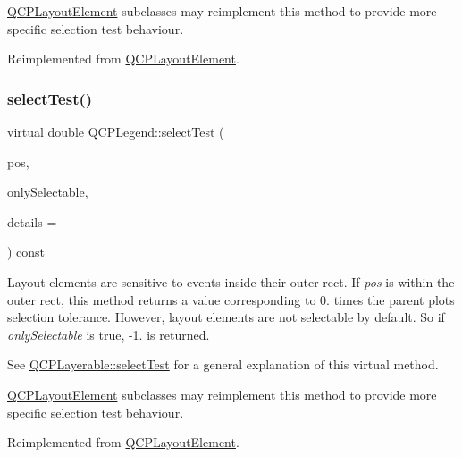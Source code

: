 \hyperlink{class_q_c_p_layout_element}{Q\+C\+P\+Layout\+Element} subclasses may reimplement this method to provide more specific selection test behaviour. 

Reimplemented from \hyperlink{class_q_c_p_layout_element_ae97f483cccedadbf18ea4525ef240ee4}{Q\+C\+P\+Layout\+Element}.

\mbox{\label{class_q_c_p_legend_a9dc868bd95069fad9f40718b7715e100}} 
\subsubsection{\texorpdfstring{select\+Test()}{selectTest()}\hspace{0.1cm}{\footnotesize\ttfamily [2/2]}}
{\footnotesize\ttfamily virtual double Q\+C\+P\+Legend\+::select\+Test (\begin{DoxyParamCaption}\item[{const Q\+PointF \&}]{pos,  }\item[{bool}]{only\+Selectable,  }\item[{Q\+Variant $\ast$}]{details = {} }\end{DoxyParamCaption}) const\hspace{0.3cm}{\ttfamily [virtual]}}

Layout elements are sensitive to events inside their outer rect. If {\itshape pos} is within the outer rect, this method returns a value corresponding to 0. times the parent plot\textquotesingle{}s selection tolerance. However, layout elements are not selectable by default. So if {\itshape only\+Selectable} is true, -\/1. is returned.

See \hyperlink{class_q_c_p_layerable_a04db8351fefd44cfdb77958e75c6288e}{Q\+C\+P\+Layerable\+::select\+Test} for a general explanation of this virtual method.

\hyperlink{class_q_c_p_layout_element}{Q\+C\+P\+Layout\+Element} subclasses may reimplement this method to provide more specific selection test behaviour. 

Reimplemented from \hyperlink{class_q_c_p_layout_element_ae97f483cccedadbf18ea4525ef240ee4}{Q\+C\+P\+Layout\+Element}.

\mbox{\label{class_q_c_p_legend_a866a9e3f5267de7430a6c7f26a61db9f}} 
